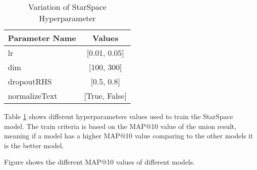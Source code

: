 \begin{table}[!h]
	\centering
	\caption{Variation of StarSpace Hyperparameter}
	\label{tab:hyperparameter-variations}
	\begin{tabular}{|l|c|}
		\hline
		\textbf{Parameter Name} & \textbf{Values} \\
		\hline
		lr & [0.01, 0.05] \\
		\hline
		dim & [100, 300] \\
		\hline
		dropoutRHS & [0.5, 0.8] \\
		\hline
		normalizeText & [True, False]\\
		\hline
	\end{tabular}
\end{table}

Table \ref{tab:hyperparameter-variations} shows different hyperparameters values used to train the StarSpace model. The train criteria is based on the MAP@10 value of the union result, meaning if a model has a higher MAP@10 value comparing to the other models it is the better model.


Figure  shows the different MAP@10 values of different models.

